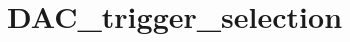 \hypertarget{group___d_a_c__trigger__selection}{\section{D\-A\-C\-\_\-trigger\-\_\-selection}
\label{group___d_a_c__trigger__selection}
}
